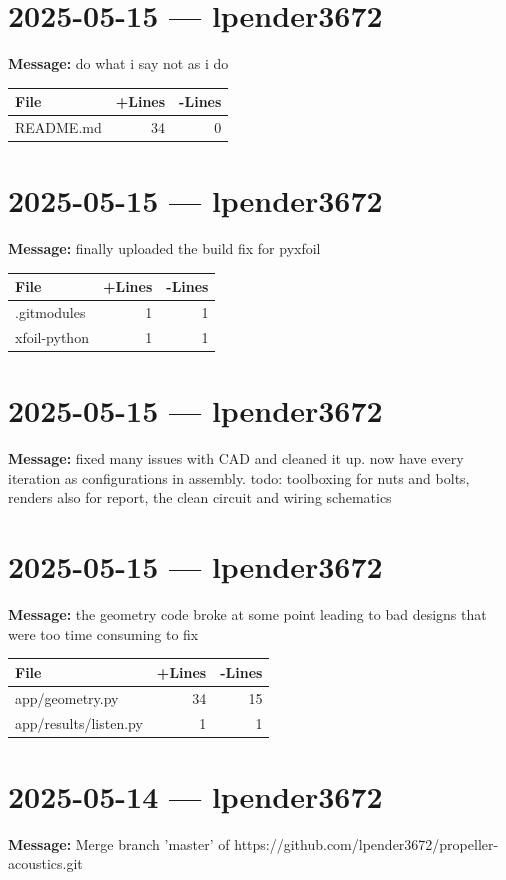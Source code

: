 \documentclass{article}
\begin{document}
\section*{2025-05-15 --- lpender3672}
\textbf{Message:} do what i say not as i do

\begin{longtable}{|p{10cm}|r|r|}
\hline \textbf{File} & \textbf{+Lines} & \textbf{-Lines} \\
\hline
README.md & 34 & 0 \\
\hline
\end{longtable}

\section*{2025-05-15 --- lpender3672}
\textbf{Message:} finally uploaded the build fix for pyxfoil

\begin{longtable}{|p{10cm}|r|r|}
\hline \textbf{File} & \textbf{+Lines} & \textbf{-Lines} \\
\hline
.gitmodules & 1 & 1 \\
\hline
xfoil-python & 1 & 1 \\
\hline
\end{longtable}

\section*{2025-05-15 --- lpender3672}
\textbf{Message:} fixed many issues with CAD and cleaned it up. now have every iteration as configurations in assembly. todo: toolboxing for nuts and bolts, renders also for report, the clean circuit and wiring schematics

\section*{2025-05-15 --- lpender3672}
\textbf{Message:} the geometry code broke at some point leading to bad designs that were too time consuming to fix

\begin{longtable}{|p{10cm}|r|r|}
\hline \textbf{File} & \textbf{+Lines} & \textbf{-Lines} \\
\hline
app/geometry.py & 34 & 15 \\
\hline
app/results/listen.py & 1 & 1 \\
\hline
\end{longtable}

\section*{2025-05-14 --- lpender3672}
\textbf{Message:} Merge branch 'master' of https://github.com/lpender3672/propeller-acoustics.git
\end{document}
